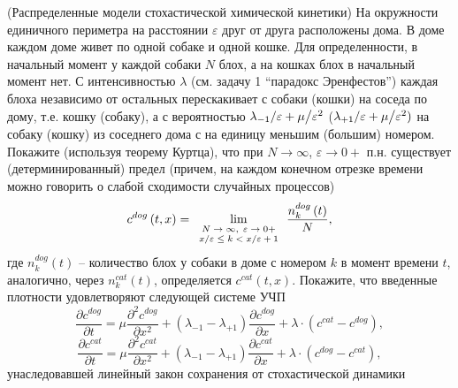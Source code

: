 \begin{problem}\Star(Распределенные модели стохастической химической кинетики)
На окружности единичного периметра на расстоянии $\varepsilon $ 
друг от друга расположены дома. В доме каждом доме живет по одной собаке и 
одной кошке. Для определенности, в начальный момент у каждой собаки $N$ 
блох, а на кошках блох в начальный момент нет. С интенсивностью $\lambda $ 
(см. задачу 1 ``парадокс Эренфестов'') каждая блоха независимо от остальных 
перескакивает с собаки (кошки) на соседа по дому, т.е. кошку (собаку), а с 
вероятностью ${\lambda _{-1} } \mathord{\left/ {\vphantom {{\lambda _{-1} } 
\varepsilon }} \right. \kern-\nulldelimiterspace} \varepsilon +\mu 
\mathord{\left/ {\vphantom {\mu {\varepsilon ^2}}} \right. 
\kern-\nulldelimiterspace} {\varepsilon ^2}$ (${\lambda _{+1} } 
\mathord{\left/ {\vphantom {{\lambda _{+1} } \varepsilon }} \right. 
\kern-\nulldelimiterspace} \varepsilon +\mu \mathord{\left/ {\vphantom {\mu 
{\varepsilon ^2}}} \right. \kern-\nulldelimiterspace} {\varepsilon ^2})$ на 
собаку (кошку) из соседнего дома с на единицу меньшим (большим) номером. 
Покажите (используя теорему Куртца), что при $N\to \infty $, $\varepsilon 
\to 0+$ п.н. существует (детерминированный) предел (причем, на каждом 
конечном отрезке времени можно говорить о слабой сходимости случайных 
процессов)
\[
c^{dog}\left( {t,x} \right)=\mathop {\lim }\limits_{{\scriptsize \begin{array}{c}
 N\to \infty ,\;\varepsilon \to 0+ \\ 
 x \mathord{\left/ {\vphantom {x \varepsilon }} \right. 
\kern-\nulldelimiterspace} \varepsilon \le k<x \mathord{\left/ {\vphantom {x 
\varepsilon }} \right. \kern-\nulldelimiterspace} \varepsilon +1 \\ 
 \end{array}}} \frac{n_k^{dog} \left( t \right)}{N},
\]
где $n_k^{dog} \left( t \right)  $ -- количество блох у собаки в доме с номером 
$k$ в момент времени $t$, аналогично, через $n_k^{cat} \left( t \right)$, 
определяется $c^{cat}\left( {t,x} \right)$. Покажите, что введенные 
плотности удовлетворяют следующей системе УЧП
\[
\frac{\partial c^{dog}}{\partial t}=\mu \frac{\partial ^2c^{dog}}{\partial 
x^2}+\left( {\lambda _{-1} -\lambda _{+1} } \right)\frac{\partial 
c^{dog}}{\partial x}+\lambda \cdot \left( {c^{cat}-c^{dog}} \right),
\]
\[
\frac{\partial c^{cat}}{\partial t}=\mu \frac{\partial ^2c^{cat}}{\partial 
x^2}+\left( {\lambda _{-1} -\lambda _{+1} } \right)\frac{\partial 
c^{cat}}{\partial x}+\lambda \cdot \left( {c^{dog}-c^{cat}} \right),
\]
унаследовавшей линейный закон сохранения от стохастической динамики


\end{problem}

